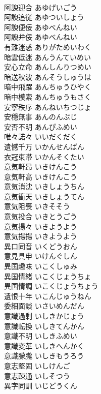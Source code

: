 \documentclass[8pt]{extreport}
\begin{document}
\begin{CJK}{UTF8}{min}
\\	阿諛迎合	あゆげいごう	
\\	阿諛追従	あゆついしょう	
\\	阿諛便佞	あゆべんねい	
\\	阿諛弁佞	あゆべんねい	
\\	有難迷惑	ありがためいわく	
\\	暗雲低迷	あんうんていめい	
\\	安心立命	あんしんりつめい	
\\	暗送秋波	あんそうしゅうは	
\\	暗中飛躍	あんちゅうひやく	
\\	暗中模索	あんちゅうもさく	
\\	安寧秩序	あんねいちつじょ	
\\	安穏無事	あんのんぶじ	
\\	安否不明	あんぴふめい	
\\	唯々諾々	いいだくだく	
\\	遺憾千万	いかんせんばん	
\\	衣冠束帯	いかんそくたい	
\\	意気軒昂	いきけんこう	
\\	意気軒高	いきけんこう	
\\	意気消沈	いきしょうちん	
\\	意気衝天	いきしょうてん	
\\	意気阻喪	いきそそう	
\\	意気投合	いきとうごう	
\\	意気揚々	いきようよう	
\\	意気揚揚	いきようよう	
\\	異口同音	いくどうおん	
\\	意見具申	いけんぐしん	
\\	異国趣味	いこくしゅみ	
\\	異国情緒	いこくじょうちょ	
\\	異国情調	いこくじょうちょう	
\\	遺恨十年	いこんじゅうねん	
\\	委細面談	いさいめんだん	
\\	意識過剰	いしきかじょう	
\\	意識転換	いしきてんかん	
\\	意識不明	いしきふめい	
\\	意識変革	いしきへんかく	
\\	意識朦朧	いしきもうろう	
\\	意志堅固	いしけんご	
\\	意志疎通	いしそつう	
\\	異字同訓	いじどうくん	

\end{CJK}
\end{document}
